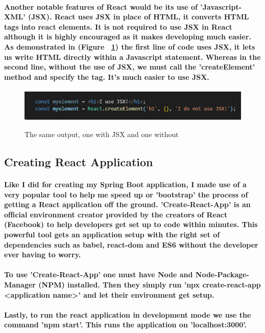 \paragraph{Another notable features of React would be its use of 'Javascript-XML' (JSX). React uses JSX in place of HTML, it converts HTML tags into react elements. It is not required to use JSX in React although it is highly encouraged as it makes developing much easier. As demonstrated in (Figure ~\ref{react2_label}) the first line of code uses JSX, it lets us write HTML directly within a Javascript statement. Whereas in the second line, without the use of JSX, we must call the 'createElement' method and specify the tag. It's much easier to use JSX.}
\begin{figure}[ht]
    \centering
    \includegraphics[scale=0.7]{Images/react2.png} 
    \label{react2_label}
    \caption{The same output, one with JSX and one without}
\end{figure}
\subsection{Creating React Application}
\paragraph{Like I did for creating my Spring Boot application, I made use of a very popular tool to help me speed up or 'bootstrap' the process of getting a React application off the ground. 'Create-React-App' is an official environment creator provided by the creators of React (Facebook) to help developers get set up to code within minutes. This powerful tool gets an application setup with the right set of dependencies such as babel, react-dom and ES6 without the developer ever having to worry.}
\paragraph{To use 'Create-React-App' one must have Node and Node-Package-Manager (NPM) installed. Then they simply run 'npx create-react-app <application name>' and let their environment get setup.}
\paragraph{Lastly, to run the react application in development mode we use the command 'npm start'. This runs the application on 'localhost:3000'.}

